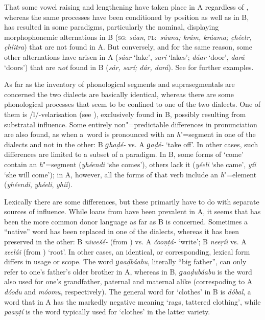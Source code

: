 That some vowel raising and lengthening have taken place in A regardless of , whereas the same processes have been conditioned by  position as well as  in B, has resulted in some paradigms, particularly the nominal, displaying morphophonemic alternations in B (\textsc{sg:} \textit{sáan}, \textsc{pl:}~\textit{súuna; krám, kráama; c̣héetr, c̣híitra}) that are not found in A. But conversely, and for the same reason, some other alternations have arisen in A (\textit{sáar} `lake', \textit{sarí} `lakes'; \textit{dáar} `door', \textit{dará} `doors') that are \textit{not} found in B (\textit{sár, sarí; dár, dará}). See  for further examples.

As far as the inventory of phonological segments and suprasegmentals are concerned the two dialects
are basically identical, whereas there are some phonological processes that seem to be confined to
one of the two dialects. One of them is /l/-velarisation (see ), exclusively
found in B, possibly resulting from \iliKalasha substratal influence. Some entirely non"=predictable differences in pronunciation are also found, as when a~word is pronounced with an \textit{h}"=segment in one of the dialects and not in the other: B \textit{ɡhaḍé-} vs. A \textit{ɡaḍé-} `take off'. In other cases, such differences are limited to a subset of a paradigm. In B, some  forms of `come' contain an \textit{h}"=segment (\textit{yhéendi} `she comes'), others lack it (\textit{yéeli} `she came', \textit{yíi} `she will come'); in A, however, all the forms of that verb include an \textit{h}"=element (\textit{yhéendi}, \textit{yhéeli}, \textit{yhíi}).


Lexically there are some differences, but these primarily have to do with separate sources of influence. While loans from \iliPashto have been prevalent in A, it seems that \iliKhowar has been the more common donor language as far as B is concerned. Sometimes a ``native'' word has been replaced in one of the dialects, whereas it has been preserved in the other: B \textit{niwešé-} (from \iliKhowar) vs. A \textit{čooṇṭá-} `write'; B \textit{neeṛíi} vs. A \textit{zeelái} (from \iliPashto) `root'. In other cases, an identical, or corresponding, lexical form differs in usage or scope. The word \textit{ɡaaḍbáabu}, literally ``big father'', can only refer to one's father's older brother in A, whereas in B, \textit{ɡaaḍubáabu} is the word also used for one's grandfather, paternal and maternal alike (correspoding to A \textit{dóodu} and \textit{móomu}, respectively). The general word for `clothes' in B is \textit{dóbal}, a word that in A has the markedly negative meaning `rags, tattered clothing', while \textit{paaṇṭí} is the word typically used for `clothes' in the latter variety.


